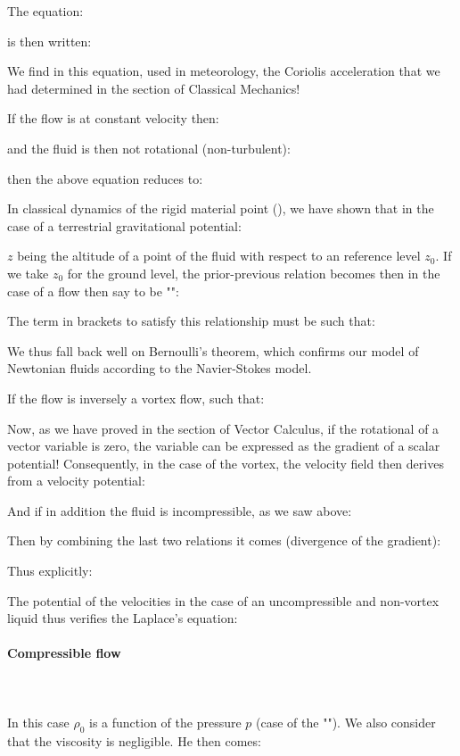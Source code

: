 	The equation:
	
	is then written:
	
	We find in this equation, used in meteorology, the Coriolis  acceleration that we had determined in the section of Classical Mechanics!
	
	If the flow is at constant velocity then:
	
	and the fluid is then not rotational (non-turbulent):
	
	then the above equation reduces to:
	
	In classical dynamics of the rigid material point (), we have shown that in the case of a terrestrial gravitational potential:
	
	$z$ being the altitude of a point of the fluid with respect to an reference level $z_0$. If we take $z_0$ for the ground level, the prior-previous relation becomes then in the case of a flow then say to be "":
	
	The term in brackets to satisfy this relationship must be such that:
	
	We thus fall back well on Bernoulli's theorem, which confirms our model of Newtonian fluids according to the Navier-Stokes model.

	If the flow is inversely a vortex flow, such that:
	
	Now, as we have proved in the section of Vector Calculus, if the rotational of a vector variable is zero, the variable can be expressed as the gradient of a scalar potential! Consequently, in the case of the vortex, the velocity field then derives from a velocity potential:
	
	And if in addition the fluid is incompressible, as we saw above:
	
	Then by combining the last two relations it comes (divergence of the gradient):
	
	Thus explicitly:
	
	The potential of the velocities in the case of an uncompressible and non-vortex liquid thus verifies the Laplace's equation:
	
	
	\pagebreak
	\paragraph{Compressible flow}\mbox{}\\\\
	In this case $\rho_0$ is a function of the pressure $p$ (case of the ""). We also consider that the viscosity is negligible. He then comes:
	
